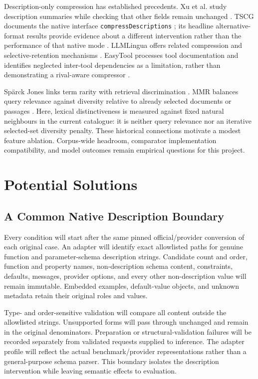 \documentclass[conference]{IEEEtran}
\begin{document}
Description-only compression has established precedents. Xu et al. study description summaries while checking that other fields remain unchanged \cite{xu}. TSCG documents the native interface \texttt{compressDescriptions} \cite{tscgcode}; its headline alternative-format results provide evidence about a different intervention rather than the performance of that native mode \cite{tscgpaper}. LLMLingua offers related compression and selective-retention mechanisms \cite{llmlingua}. EasyTool processes tool documentation and identifies neglected inter-tool dependencies as a limitation, rather than demonstrating a rival-aware compressor \cite{easytool}.

Sp\"{a}rck Jones links term rarity with retrieval discrimination \cite{specificity}. MMR balances query relevance against diversity relative to already selected documents or passages \cite{mmr}. Here, lexical distinctiveness is measured against fixed natural neighbours in the current catalogue: it is neither query relevance nor an iterative selected-set diversity penalty. These historical connections motivate a modest feature ablation. Corpus-wide headroom, comparator implementation compatibility, and model outcomes remain empirical questions for this project.

\section{Potential Solutions}
\subsection{A Common Native Description Boundary}
Every condition will start after the same pinned official/provider conversion of each original case. An adapter will identify exact allowlisted paths for genuine function and parameter-schema description strings. Candidate count and order, function and property names, non-description schema content, constraints, defaults, messages, provider options, and every other non-description value will remain immutable. Embedded examples, default-value objects, and unknown metadata retain their original roles and values.

Type- and order-sensitive validation will compare all content outside the allowlisted strings. Unsupported forms will pass through unchanged and remain in the original denominators. Preparation or structural-validation failures will be recorded separately from validated requests supplied to inference. The adapter profile will reflect the actual benchmark/provider representations rather than a general-purpose schema parser. This boundary isolates the description intervention while leaving semantic effects to evaluation.
\end{document}
